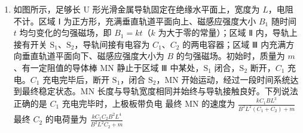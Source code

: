 \documentclass[\gkver]{gaokaozhenti}
\begin{document}
\begin{enumerate}
{\[ v'\Delta t_{2} = v\Delta t_{2} + \frac{1}{2}a(\Delta t_{2})^{2} \]

解得 $\Delta t_{2} = 2t_{0}$

所以 $5t_{0}$ 时刻发生第三次碰撞，第三次碰前瞬间 M 的速度为 $v' = 2v$，N 的速度为 $v'' = v + a\Delta t_{2} = 3v$

对比选项中图像可知 AD 正确，BC 错误。

故选 AD。
}

\item
如图所示，足够长 U 形光滑金属导轨固定在绝缘水平面上，宽度为 $L$，电阻不计。区域 Ⅰ 为正方形，充满垂直轨道平面向上、磁感应强度大小 $B_{1}$ 随时间 $t$ 均匀变化的匀强磁场，即 $B_{1} = kt$（$k$ 为大于零的常量）；区域 Ⅱ 内，导轨上接有开关 $\text{S}_{1}$、$\text{S}_{2}$，导轨间接有电容为 $C_{1}$、$C_{2}$ 的两电容器；区域 Ⅲ 内充满方向垂直轨道平面向下、磁感应强度大小为 $B$ 的匀强磁场。初始时，质量为 $m$、有一定阻值的导体棒 MN 静止于区域 Ⅲ 中某处，$\text{S}_{1}$ 闭合，$\text{S}_{2}$ 断开，$C_{1}$ 充电。$C_{1}$ 充电完毕后，断开 $\text{S}_{1}$，闭合 $\text{S}_{2}$，MN 开始运动，经过一段时间系统达到最终稳定状态。MN 长度与导轨宽度相同并始终与导轨接触良好。下列说法正确的是 
\onepicture[w=7cm]{}
{$C_{1}$ 充电完毕时，上极板带负电}
{最终 MN 的速度为 $\frac{kC_{1}BL^{3}}{B^{2}L^{2}(C_{1} + C_{2}) + m}$}
{最终 $C_{2}$ 的电荷量为 $\frac{kC_{1}C_{2}B^{2}L^{4}}{B^{2}L^{2}C_{2} + m}$}
\end{enumerate}
\end{document}

